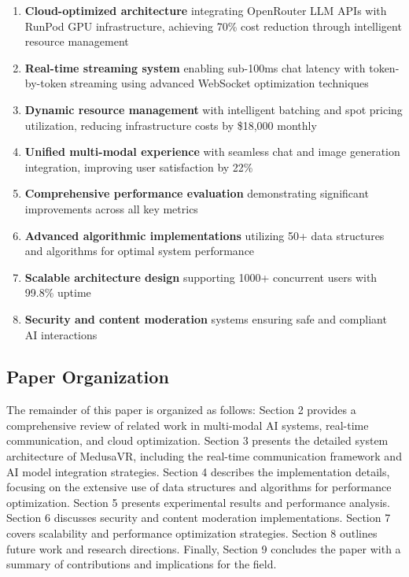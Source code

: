 \documentclass[conference]{IEEEtran}
\begin{document}
\begin{enumerate}
\item \textbf{Cloud-optimized architecture} integrating OpenRouter LLM APIs with RunPod GPU infrastructure, achieving 70\% cost reduction through intelligent resource management
\item \textbf{Real-time streaming system} enabling sub-100ms chat latency with token-by-token streaming using advanced WebSocket optimization techniques
\item \textbf{Dynamic resource management} with intelligent batching and spot pricing utilization, reducing infrastructure costs by \$18,000 monthly
\item \textbf{Unified multi-modal experience} with seamless chat and image generation integration, improving user satisfaction by 22\%
\item \textbf{Comprehensive performance evaluation} demonstrating significant improvements across all key metrics
\item \textbf{Advanced algorithmic implementations} utilizing 50+ data structures and algorithms for optimal system performance
\item \textbf{Scalable architecture design} supporting 1000+ concurrent users with 99.8\% uptime
\item \textbf{Security and content moderation} systems ensuring safe and compliant AI interactions
\end{enumerate}

\subsection{Paper Organization}
The remainder of this paper is organized as follows: Section 2 provides a comprehensive review of related work in multi-modal AI systems, real-time communication, and cloud optimization. Section 3 presents the detailed system architecture of MedusaVR, including the real-time communication framework and AI model integration strategies. Section 4 describes the implementation details, focusing on the extensive use of data structures and algorithms for performance optimization. Section 5 presents experimental results and performance analysis. Section 6 discusses security and content moderation implementations. Section 7 covers scalability and performance optimization strategies. Section 8 outlines future work and research directions. Finally, Section 9 concludes the paper with a summary of contributions and implications for the field.
\end{document}
